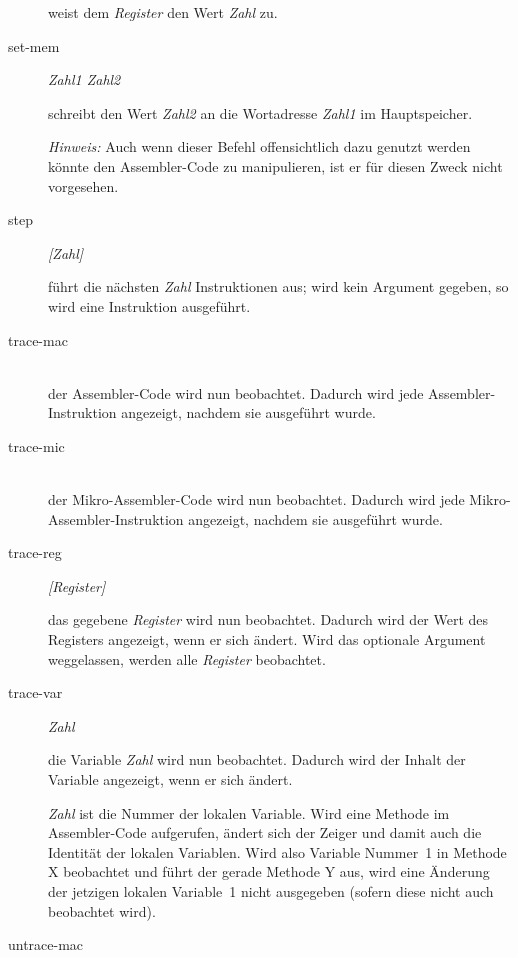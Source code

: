 \begin{description}
  weist dem \emph{Register} den Wert \emph{Zahl} zu.

\item[set-mem] \emph{Zahl1 Zahl2}

  schreibt den Wert \emph{Zahl2} an die Wortadresse \emph{Zahl1} im Hauptspeicher.

  \emph{Hinweis:} Auch wenn dieser Befehl offensichtlich dazu genutzt werden könnte den Assembler-Code zu manipulieren, ist er für diesen Zweck nicht vorgesehen.

\item[step] \emph{[Zahl]}

  führt die nächsten \emph{Zahl} Instruktionen aus; wird kein Argument gegeben, so wird eine Instruktion ausgeführt.

\item[trace-mac] \hspace*{\fill}\\
  
  der Assembler-Code wird nun beobachtet. Dadurch wird jede Assembler-Instruktion angezeigt, nachdem sie ausgeführt wurde.

\item[trace-mic] \hspace*{\fill}\\

  der Mikro-Assembler-Code wird nun beobachtet. Dadurch wird jede Mikro-Assembler-Instruktion angezeigt, nachdem sie ausgeführt wurde.

\item[trace-reg] \emph{[Register]}

  das gegebene \emph{Register} wird nun beobachtet. Dadurch wird der Wert des Registers angezeigt, wenn er sich ändert. Wird das optionale Argument weggelassen, werden alle \emph{Register} beobachtet.

\item[trace-var] \emph{Zahl}

  die Variable \emph{Zahl} wird nun beobachtet. Dadurch wird der Inhalt der Variable angezeigt, wenn er sich ändert.

  \emph{Zahl} ist die Nummer der lokalen Variable. Wird eine Methode im Assembler-Code aufgerufen, ändert sich der Zeiger  und damit auch die Identität der lokalen Variablen. Wird also Variable Nummer~1 in Methode X beobachtet und führt der \md{} gerade Methode Y aus, wird eine Änderung der jetzigen lokalen Variable~1 nicht ausgegeben (sofern diese nicht auch beobachtet wird).

\item[untrace-mac] \hspace*{\fill}\\
  

\end{description}
